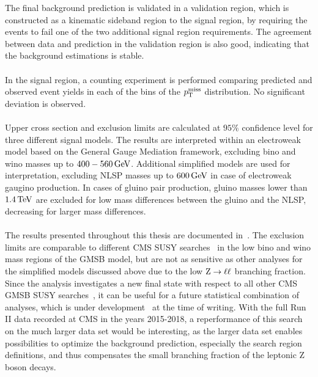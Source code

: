 The final background prediction is validated in a validation region, which is constructed as a kinematic sideband region to the signal region, by requiring the events to fail one of the two additional signal region requirements. The agreement between data and prediction in the validation region is also good, indicating that the background estimations is stable.\\\\
In the signal region, a counting experiment is performed comparing predicted and observed event yields in each of the bins of the $p_{\mathrm{T}}^\text{miss}$ distribution. No significant deviation is observed.\\\\
Upper cross section and exclusion limits are calculated at $95\%$ confidence level for three different signal models. The results are interpreted within an electroweak model based on the General Gauge Mediation framework, excluding bino and wino masses up to $400-560\,\text{Ge\hspace{-.08em}V}$. Additional simplified models are used for interpretation, excluding NLSP masses up to $600\,\text{Ge\hspace{-.08em}V}$ in case of electroweak gaugino production. In cases of gluino pair production, gluino masses lower than $1.4\,\text{Te\hspace{-.08em}V}$ are excluded for low mass differences between the gluino and the NLSP, decreasing for larger mass differences.\\\\
The results presented throughout this thesis are documented in~\cite{MyAN}. The exclusion limits are comparable to different CMS SUSY searches~\cite{PhotonMet} in the low bino and wino mass regions of the GMSB model, but are not as sensitive as other analyses for the simplified models discussed above due to the low $\mathrm{Z}\to\ell\ell$ branching fraction. Since the analysis investigates a new final state with respect to all other CMS GMSB SUSY searches~\cite{PhotonMet,PhotonHT,PhotonBJet}, it can be useful for a future statistical combination of analyses, which is under development~\cite{Danilo} at the time of writing. With the full Run II data recorded at CMS in the years 2015-2018, a reperformance of this search on the much larger data set would be interesting, as the larger data set enables possibilities to optimize the background prediction, especially the search region definitions, and thus compensates the small branching fraction of the leptonic Z boson decays.
